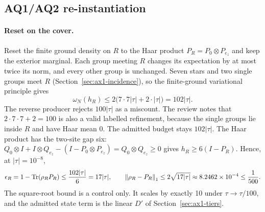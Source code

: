 \subsection{AQ1/AQ2 re-instantiation}
\label{sec:ax1-checklist}
\paragraph{Reset on the cover.}
Reset the finite ground density on $R$ to the Haar product
$P_R=P_0\otimes P_{e_z}$ and keep the exterior marginal. Each group meeting
$R$ changes its expectation by at most twice its norm, and every other group
is unchanged. Seven stars and two single groups meet $R$
(Section~\ref{sec:ax1-incidence}), so the finite-ground variational principle
gives
\begin{equation}
 \omega_N(h_R)\le2\bigl(7\cdot7|\tau|+2\cdot|\tau|\bigr)=102|\tau| .
 \label{eq:ax1-reset}
\end{equation}
The reverse producer rejects $100|\tau|$ as a miscount. The review notes that
$2\cdot7\cdot7+2=100$ is also a valid labelled refinement, because the single
groups lie inside $R$ and have Haar mean $0$. The admitted budget stays
$102|\tau|$. The Haar product has the two-site gap six:
$Q_0\otimes I+I\otimes Q_{e_z}-(I-P_0\otimes P_{e_z})=Q_0\otimes Q_{e_z}\ge0$
gives $h_R\ge6(I-P_R)$. Hence, at $|\tau|=10^{-8}$,
\begin{equation}
 \epsilon_R=1-\operatorname{Tr}(\rho_RP_R)\le\frac{102|\tau|}6=17|\tau|,\qquad
 \left\lVert\rho_R-P_R\right\rVert_1\le2\sqrt{17|\tau|}\approx8.2462\times10^{-4}\le\frac1{500}.
 \label{eq:ax1-epsR}
\end{equation}
The square-root bound is a control only. It scales by exactly 10 under
$\tau\to\tau/100$, and the admitted state term is the linear $D'$ of
Section~\ref{sec:ax1-tiers}.

